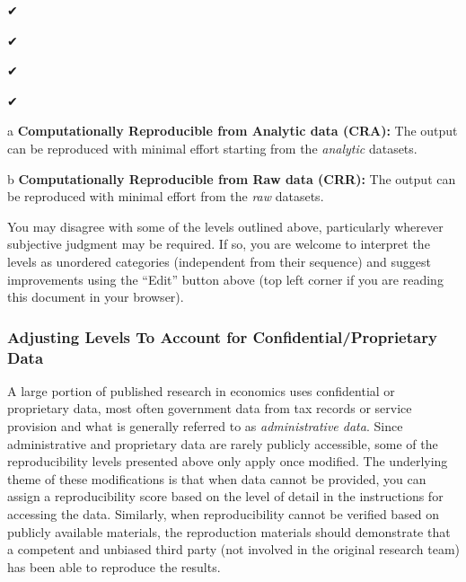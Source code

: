 \documentclass[]{book}
\begin{document}
✔

✔

✔

✔

a \textbf{Computationally Reproducible from Analytic data (CRA):} The output can be reproduced with minimal effort starting from the \emph{analytic} datasets.

b \textbf{Computationally Reproducible from Raw data (CRR):} The output can be reproduced with minimal effort from the \emph{raw} datasets.

You may disagree with some of the levels outlined above, particularly wherever subjective judgment may be required. If so, you are welcome to interpret the levels as unordered categories (independent from their sequence) and suggest improvements using the ``Edit'' button above (top left corner if you are reading this document in your browser).

\hypertarget{adjusting-levels-to-account-for-confidentialproprietary-data}{%
\subsubsection*{Adjusting Levels To Account for Confidential/Proprietary Data}\label{adjusting-levels-to-account-for-confidentialproprietary-data}}

A large portion of published research in economics uses confidential or proprietary data, most often government data from tax records or service provision and what is generally referred to as \emph{administrative data}. Since administrative and proprietary data are rarely publicly accessible, some of the reproducibility levels presented above only apply once modified. The underlying theme of these modifications is that when data cannot be provided, you can assign a reproducibility score based on the level of detail in the instructions for accessing the data. Similarly, when reproducibility cannot be verified based on publicly available materials, the reproduction materials should demonstrate that a competent and unbiased third party (not involved in the original research team) has been able to reproduce the results.
\end{document}
